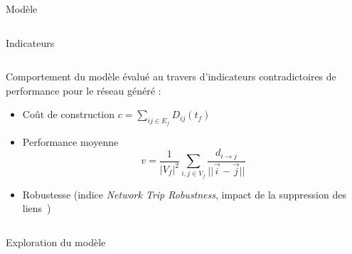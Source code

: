 \documentclass{beamer}
\begin{document}
\begin{frame}{}
\begin{columns}[t]
\begin{column}{.49\textwidth}
\begin{block}{Modèle}
\begin{columns}[t]
\begin{column}{.95\textwidth}
\begin{justify}
\end{justify}
          \end{column}
          \end{columns}
        \end{block}
        
        
        \begin{block}{Indicateurs}
       \vspace{-2cm}
        \begin{columns}[t]
        \begin{column}{.95\textwidth}
        \begin{justify}
          Comportement du modèle évalué au travers d'indicateurs contradictoires de performance pour le réseau généré :
          \bigskip
          \begin{itemize}
          \item Coût de construction $c=\sum_{ij\in E_f}D_{ij}(t_f)$
          \bigskip
          \item \begin{justify}Performance moyenne~\cite{banos2012towards}
          \[
          v=\frac{1}{|V_f|^2}\sum_{i,j\in V_f}\frac{d_{i\rightarrow j}}{||\vec{i}-\vec{j}||}
          \]
          \end{justify}
          \bigskip
          \item Robustesse (indice \textit{Network Trip Robustness}, impact de la suppression des liens~\cite{sullivan2010identifying})
          \end{itemize}

          \end{justify}
          \end{column}
          \end{columns}
        \end{block}
        
        \begin{block}{Exploration du modèle}
        \begin{columns}[t]
        \begin{column}{.7\textwidth}
        	

\end{column}
\end{columns}
\end{block}
\end{column}
\end{columns}
\end{frame}
\end{document}
